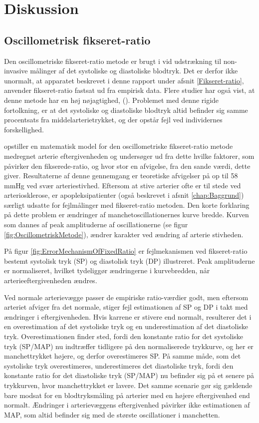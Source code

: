 \chapter{Diskussion}

\section{Oscillometrisk fikseret-ratio}
Den oscillometriske fikseret-ratio metode er brugt i vid udstrækning til non-invasive målinger af det systoliske og diastoliske blodtryk. Det er derfor ikke unormalt, at apparatet beskrevet i denne rapport under afsnit \ref{Fikseret-ratio}, anvender fikseret-ratio fastsat ud fra empirisk data. Flere studier har også vist, at denne metode har en høj nøjagtighed, (\cite{drzewiecki1994theory}). Problemet med denne rigide fortolkning, er at det systoliske og diastoliske blodtryk altid befinder sig samme procentsats fra middelarterietrykket, og der opstår fejl ved individernes forskellighed.

 \cite{RefWorks:13} opstiller en matematisk model for den oscillometriske fikseret-ratio metode medregnet arterie eftergivenheden og undersøger ud fra dette hvilke faktorer, som påvirker den fikserede-ratio, og hvor stor en afvigelse, fra den sande værdi, dette giver. Resultaterne af denne gennemgang er teoretiske afvigelser på op til 58 mmHg ved svær arteriestivhed. Eftersom at stive arterier ofte er til stede ved arteriosklerose, er apopleksipatienter (også beskrevet i afsnit \ref{chap:Baggrund}) særligt udsatte for fejlmålinger med fikseret-ratio metoden. Den korte forklaring på dette problem er ændringer af manchetoscillationernes kurve bredde. Kurven som dannes af peak amplituderne af oscillationerne (se figur \ref{fig:OscillometriskMetode}), ændrer karakter ved ændring af arterie stivheden. 
 
 På figur \ref{fig:ErrorMechanismOfFixedRatio} er fejlmekanismen ved fikseret-ratio bestemt systolisk tryk (SP) og diastolisk tryk (DP) illustreret. Peak amplituderne er normaliseret, hvilket tydeliggør ændringerne i kurvebredden, når arterieeftergivenheden ændres. 
 
 Ved normale arterievægge passer de empiriske ratio-værdier godt, men eftersom arteriet afviger fra det normale, stiger fejl estimationen af SP og DP i takt med ændringer i eftergivenheden. Hvis karrene er stivere end normalt, resulterer det i en overestimation af det systoliske tryk og en underestimation af det diastoliske tryk. Overestimationen finder sted, fordi den konstante ratio for det systoliske tryk (SP/MAP) nu indtræffer tidligere på den normaliserede trykkurve, og her er manchettrykket højere, og derfor overestimeres SP. På samme måde, som det systoliske tryk overestimeres, underestimeres det diastoliske tryk, fordi den konstante ratio for det diastoliske tryk (SP/MAP) nu befinder sig på et senere på trykkurven, hvor manchettrykket er lavere. Det samme scenarie gør sig gældende bare modsat for en blodtryksmåling på arterier med en højere eftergivenhed end normalt. Ændringer i arterievæggens eftergivenhed påvirker ikke estimationen af MAP, som altid befinder sig med de største oscillationer i manchetten.

